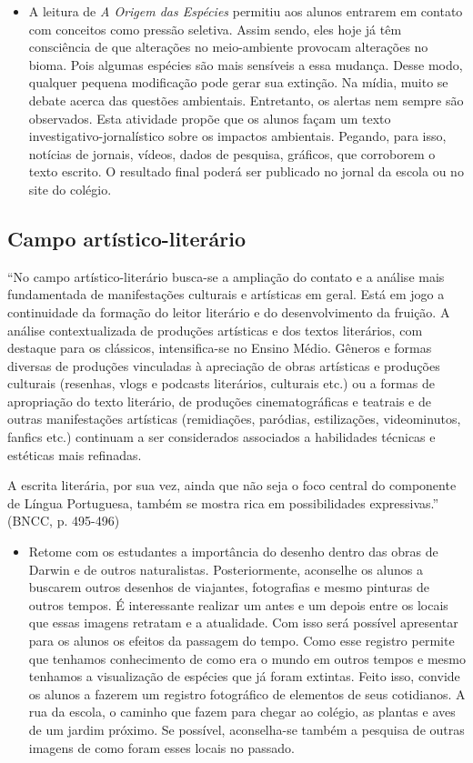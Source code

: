 \documentclass[12pt]{extarticle}
\begin{document}
\begin{itemize}
\item
  A leitura de \emph{A Origem das Espécies} permitiu aos alunos entrarem
  em contato com conceitos como pressão seletiva. Assim sendo, eles hoje
  já têm consciência de que alterações no meio-ambiente provocam
  alterações no bioma. Pois algumas espécies são mais sensíveis a essa
  mudança. Desse modo, qualquer pequena modificação pode gerar sua
  extinção. Na mídia, muito se debate acerca das questões ambientais.
  Entretanto, os alertas nem sempre são observados. Esta atividade
  propõe que os alunos façam um texto investigativo-jornalístico sobre
  os impactos ambientais. Pegando, para isso, notícias de jornais,
  vídeos, dados de pesquisa, gráficos, que corroborem o texto escrito. O
  resultado final poderá ser publicado no jornal da escola ou no site do
  colégio.
\end{itemize}

\subsection{Campo artístico-literário }

``No campo artístico-literário busca-se a ampliação do contato e a
análise mais fundamentada de manifestações culturais e artísticas em
geral. Está em jogo a continuidade da formação do leitor literário e do
desenvolvimento da fruição. A análise contextualizada de produções
artísticas e dos textos literários, com destaque para os clássicos,
intensifica-se no Ensino Médio. Gêneros e formas diversas de produções
vinculadas à apreciação de obras artísticas e produções culturais
(resenhas, vlogs e podcasts literários, culturais etc.) ou a formas de
apropriação do texto literário, de produções cinematográficas e teatrais
e de outras manifestações artísticas (remidiações, paródias,
estilizações, videominutos, fanfics etc.) continuam a ser considerados
associados a habilidades técnicas e estéticas mais refinadas.

A escrita literária, por sua vez, ainda que não seja o foco central do
componente de Língua Portuguesa, também se mostra rica em possibilidades
expressivas.'' (BNCC, p. 495-496)

\begin{itemize}
\item
  Retome com os estudantes a importância do desenho dentro das obras de
  Darwin e de outros naturalistas. Posteriormente, aconselhe os alunos a
  buscarem outros desenhos de viajantes, fotografias e mesmo pinturas de
  outros tempos. É interessante realizar um antes e um depois entre os
  locais que essas imagens retratam e a atualidade. Com isso será
  possível apresentar para os alunos os efeitos da passagem do tempo.
  Como esse registro permite que tenhamos conhecimento de como era o
  mundo em outros tempos e mesmo tenhamos a visualização de espécies que
  já foram extintas. Feito isso, convide os alunos a fazerem um registro
  fotográfico de elementos de seus cotidianos. A rua da escola, o
  caminho que fazem para chegar ao colégio, as plantas e aves de um
  jardim próximo. Se possível, aconselha-se também a pesquisa de outras
  imagens de como foram esses locais no passado.
\end{itemize}
\end{document}
